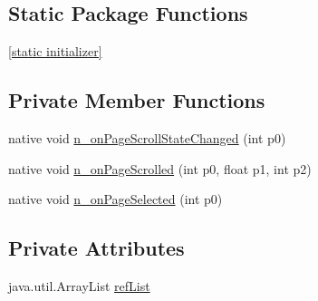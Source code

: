 \subsection*{Static Package Functions}
\begin{CompactItemize}
\item 
\hyperlink{classmono_1_1android_1_1support_1_1v4_1_1view_1_1_view_pager___on_page_change_listener_implementor_eb035fd0ace82a0114ffa34017106502}{\mbox{[}static initializer\mbox{]}}
\end{CompactItemize}
\subsection*{Private Member Functions}
\begin{CompactItemize}
\item 
native void \hyperlink{classmono_1_1android_1_1support_1_1v4_1_1view_1_1_view_pager___on_page_change_listener_implementor_c0bb8b112f1264bc3a0617a2eba52377}{n\_\-onPageScrollStateChanged} (int p0)
\item 
native void \hyperlink{classmono_1_1android_1_1support_1_1v4_1_1view_1_1_view_pager___on_page_change_listener_implementor_e46bfb35c6f6a29a624cc22f5b5da478}{n\_\-onPageScrolled} (int p0, float p1, int p2)
\item 
native void \hyperlink{classmono_1_1android_1_1support_1_1v4_1_1view_1_1_view_pager___on_page_change_listener_implementor_050f6b173daa152eb6386aed8949322b}{n\_\-onPageSelected} (int p0)
\end{CompactItemize}
\subsection*{Private Attributes}
\begin{CompactItemize}
\item 
java.util.ArrayList \hyperlink{classmono_1_1android_1_1support_1_1v4_1_1view_1_1_view_pager___on_page_change_listener_implementor_decda4faad50e9549be7c7b10a5e4e55}{refList}
\end{CompactItemize}


